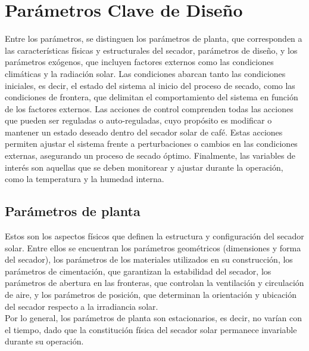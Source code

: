 \documentclass[12pt]{article}
\begin{document}
\section{Parámetros Clave de Diseño}
\label{sec:parametros_clave_de_diseño}

Entre los parámetros, se distinguen los parámetros de planta, que corresponden a las características físicas y estructurales del secador, parámetros de diseño, y los parámetros exógenos, que incluyen factores externos como las condiciones climáticas y la radiación solar. Las condiciones abarcan tanto las condiciones iniciales, es decir, el estado del sistema al inicio del proceso de secado, como las condiciones de frontera, que delimitan el comportamiento del sistema en función de los factores externos. Las acciones de control comprenden todas las acciones que pueden ser reguladas o auto-reguladas, cuyo propósito es modificar o mantener un estado deseado dentro del secador solar de café. Estas acciones permiten ajustar el sistema frente a perturbaciones o cambios en las condiciones externas, asegurando un proceso de secado óptimo. Finalmente, las variables de interés son aquellas que se deben monitorear y ajustar durante la operación, como la temperatura y la humedad interna.\\


\subsection{Parámetros de planta}
Estos son los aspectos físicos que definen la estructura y configuración del secador solar. Entre ellos se encuentran los parámetros geométricos (dimensiones y forma del secador), los parámetros de los materiales utilizados en su construcción, los parámetros de cimentación, que garantizan la estabilidad del secador, los parámetros de abertura en las fronteras, que controlan la ventilación y circulación de aire, y los parámetros de posición, que determinan la orientación y ubicación del secador respecto a la irradiancia solar.\\

Por lo general, los parámetros de planta son estacionarios, es decir, no varían con el tiempo, dado que la constitución física del secador solar permanece invariable durante su operación.\\%
\end{document}
